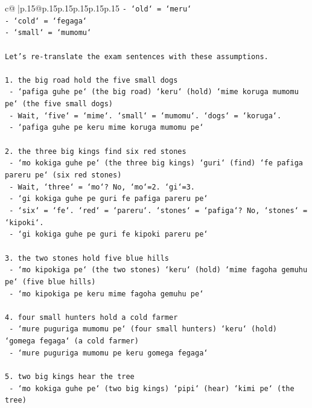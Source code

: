 \documentclass{article}
\begin{document}
{\begin{supertabular}{c@{$\;$}|p{.15\linewidth}@{}p{.15\linewidth}p{.15\linewidth}p{.15\linewidth}p{.15\linewidth}p{.15\linewidth}}
{{{\texttt{{-} `old` = `meru`} \\
\texttt{{-} `cold` = `fegaga`} \\
\texttt{{-} `small` = `mumomu`} \\
\\ 
\texttt{Let's re{-}translate the exam sentences with these assumptions.} \\
\\ 
\texttt{1. the big road hold the five small dogs} \\
\texttt{   {-} `pafiga guhe pe` (the big road) `keru` (hold) `mime koruga mumomu pe` (the five small dogs)} \\
\texttt{   {-} Wait, `five` = `mime`. `small` = `mumomu`. `dogs` = `koruga`.} \\
\texttt{   {-} `pafiga guhe pe keru mime koruga mumomu pe`} \\
\\ 
\texttt{2. the three big kings find six red stones} \\
\texttt{   {-} `mo kokiga guhe pe` (the three big kings) `guri` (find) `fe pafiga pareru pe` (six red stones)} \\
\texttt{   {-} Wait, `three` = `mo`? No, `mo`=2. `gi`=3.} \\
\texttt{   {-} `gi kokiga guhe pe guri fe pafiga pareru pe`} \\
\texttt{   {-} `six` = `fe`. `red` = `pareru`. `stones` = `pafiga`? No, `stones` = `kipoki`.} \\
\texttt{   {-} `gi kokiga guhe pe guri fe kipoki pareru pe`} \\
\\ 
\texttt{3. the two stones hold five blue hills} \\
\texttt{   {-} `mo kipokiga pe` (the two stones) `keru` (hold) `mime fagoha gemuhu pe` (five blue hills)} \\
\texttt{   {-} `mo kipokiga pe keru mime fagoha gemuhu pe`} \\
\\ 
\texttt{4. four small hunters hold a cold farmer} \\
\texttt{   {-} `mure puguriga mumomu pe` (four small hunters) `keru` (hold) `gomega fegaga` (a cold farmer)} \\
\texttt{   {-} `mure puguriga mumomu pe keru gomega fegaga`} \\
\\ 
\texttt{5. two big kings hear the tree} \\
\texttt{   {-} `mo kokiga guhe pe` (two big kings) `pipi` (hear) `kimi pe` (the tree)} \\
}}}
\end{supertabular}}
\end{document}

